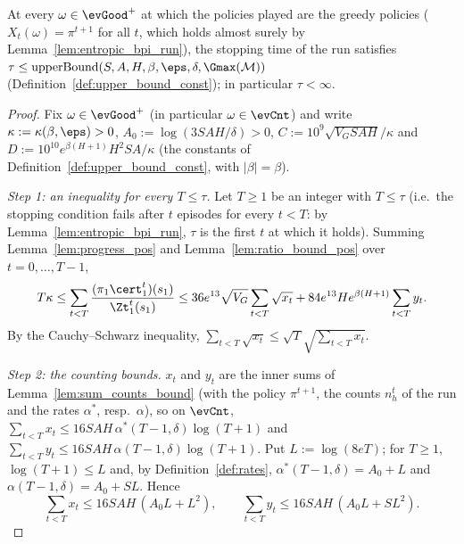 \begin{lemma}\label{lem:stopping_time_bound_pos}
\leanok
{}
At every $\omega \in \evGood^+$ at which the policies played are the greedy policies
($X_t(\omega) = \pi^{t+1}$ for all $t$, which holds almost surely by Lemma~\ref{lem:entropic_bpi_run}),
the stopping time of the run satisfies
$\tau \le \mathrm{upperBound}(S, A, H, \beta, \eps, \delta, \Gmax(\mathcal M))$ (Definition~\ref{def:upper_bound_const});
in particular $\tau < \infty$.
\end{lemma}

\begin{proof}
\leanok
Fix $\omega \in \evGood^+$ (in particular $\omega \in \evCnt$) and write $\kappa := \kappa(\beta,\eps) > 0$,
$A_0 := \log(3SAH/\delta) > 0$, $C := 10^9\sqrt{V_G SAH}/\kappa$ and $D := 10^{10}e^{\beta(H+1)}H^2SA/\kappa$ (the
constants of Definition~\ref{def:upper_bound_const}, with $|\beta| = \beta$).

\emph{Step 1: an inequality for every $T \le \tau$.} Let $T \ge 1$ be an integer with $T \le \tau$
(i.e.\ the stopping condition fails after $t$ episodes for every $t < T$: by
Lemma~\ref{lem:entropic_bpi_run}, $\tau$ is the first $t$ at which it holds). Summing
Lemma~\ref{lem:progress_pos} and Lemma~\ref{lem:ratio_bound_pos} over $t = 0, \dots, T - 1$,
\[
  T\kappa \le \sum_{t < T}\frac{(\pi_1\cert_1^t)(s_1)}{\Zt_1^t(s_1)}
  \le 36e^{13}\sqrt{V_G}\sum_{t < T}\sqrt{x_t} + 84e^{13}He^{\beta(H+1)}\sum_{t < T}y_t .
\]
By the Cauchy--Schwarz inequality, $\sum_{t < T}\sqrt{x_t} \le \sqrt{T}\sqrt{\sum_{t < T}x_t}$.

\emph{Step 2: the counting bounds.} $x_t$ and $y_t$ are the inner sums of
Lemma~\ref{lem:sum_counts_bound} (with the policy $\pi^{t+1}$, the counts $n_h^t$ of the run and the
rates $\alpha^*$, resp.\ $\alpha$), so on $\evCnt$,
$\sum_{t < T}x_t \le 16SAH\,\alpha^*(T-1,\delta)\log(T+1)$ and $\sum_{t < T}y_t \le 16SAH\,\alpha(T-1,\delta)\log(T+1)$.
Put $L := \log(8eT)$; for $T \ge 1$, $\log(T+1) \le L$ and, by Definition~\ref{def:rates},
$\alpha^*(T-1,\delta) = A_0 + L$ and $\alpha(T-1,\delta) = A_0 + SL$. Hence
\[
  \sum_{t < T}x_t \le 16SAH\,(A_0L + L^2), \qquad \sum_{t < T}y_t \le 16SAH\,(A_0L + SL^2) .
\]


\end{proof}
